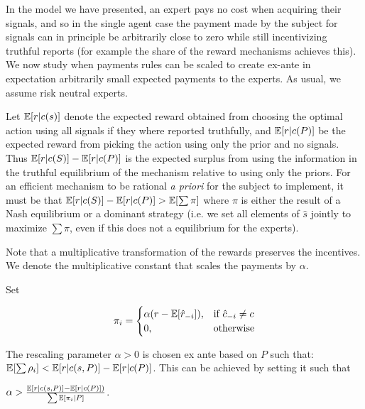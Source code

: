 In the model we have presented, an expert pays no cost when acquiring their signals, and so in the single agent case the payment made by the subject for signals can in principle be arbitrarily close to zero while still incentivizing truthful reports (for example the share of the reward mechanisms achieves this). We now study when payments rules can be scaled to create ex-ante in expectation arbitrarily small expected payments to the experts. As usual, we assume risk neutral experts. 


Let $\operatorname*{\mathbb E}[r|c(s)]$ denote the expected reward obtained from choosing the optimal action using all signals if they where reported truthfully, and $\operatorname*{\mathbb E}[r|c(P)] $ be the expected reward from picking the action using only the prior and no signals. Thus $\operatorname*{\mathbb E}[r|c(S)] - \operatorname*{\mathbb E}[r|c(P)] $ is the expected surplus from using the information in the truthful equilibrium of the mechanism relative to using only the priors. For an efficient mechanism to be rational \emph{a priori} for the subject to implement, it must be that $\operatorname*{\mathbb E}[r|c(S)] - \operatorname*{\mathbb E}[r|c(P)] > \operatorname*{\mathbb E}[\sum \pi]$ where $\pi$ is either the result of a Nash equilibrium or a dominant strategy (i.e. we set all elements of $\hat{s}$ jointly to maximize $\sum \pi$, even if this does not a equilibrium for the experts).

Note that a multiplicative transformation of the rewards preserves the incentives. We denote the multiplicative constant that scales the payments by $\alpha$.

\begin{mech}
Set

\[
    \pi_i = 
\begin{cases}
    \alpha (r - \expec[\hat{r}_{-i}] ),& \text{if } \hat{c}_{-i} \neq c\\
    0,              & \text{otherwise}
\end{cases}
\]

The rescaling parameter $\alpha>0$ is chosen ex ante based on $P$ such that: $ \operatorname*{\mathbb E}[\sum \rho_i] < \operatorname*{\mathbb E}[r|c(s,P)] - \operatorname*{\mathbb E}[r|c(P)] $. This can be achieved by setting it such that

 $\alpha >   \frac{\operatorname*{\mathbb E}[r|c(s,P)] - \operatorname*{\mathbb E}[r|c(P)] )}{\sum \operatorname*{\mathbb E}[\pi_i|P] }  $. 

\end{mech}



